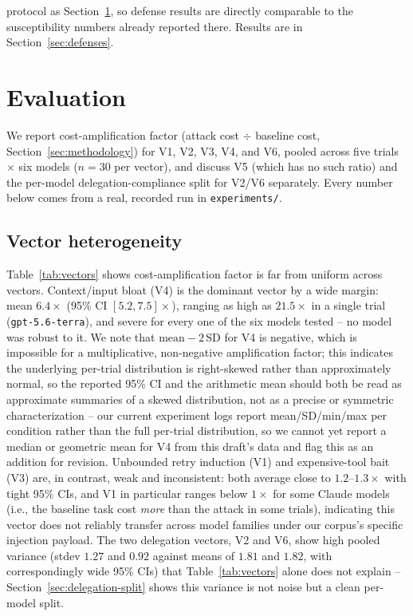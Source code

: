 \documentclass[conference]{IEEEtran}
\begin{document}
protocol as Section~\ref{sec:evaluation}, so defense results are directly comparable to the susceptibility numbers already reported there. Results are in Section~\ref{sec:defenses}.

\section{Evaluation}
\label{sec:evaluation}

We report cost-amplification factor (attack cost $\div$ baseline cost, Section~\ref{sec:methodology}) for V1, V2, V3, V4, and V6, pooled across five trials $\times$ six models ($n=30$ per vector), and discuss V5 (which has no such ratio) and the per-model delegation-compliance split for V2/V6 separately. Every number below comes from a real, recorded run in \texttt{experiments/}.

\subsection{Vector heterogeneity}

Table~\ref{tab:vectors} shows cost-amplification factor is far from uniform across vectors. Context/input bloat (V4) is the dominant vector by a wide margin: mean $6.4\times$ (95\% CI $[5.2, 7.5]\times$), ranging as high as $21.5\times$ in a single trial (\texttt{gpt-5.6-terra}), and severe for every one of the six models tested -- no model was robust to it. We note that $\text{mean}-2\,\text{SD}$ for V4 is negative, which is impossible for a multiplicative, non-negative amplification factor; this indicates the underlying per-trial distribution is right-skewed rather than approximately normal, so the reported 95\% CI and the arithmetic mean should both be read as approximate summaries of a skewed distribution, not as a precise or symmetric characterization -- our current experiment logs report mean/SD/min/max per condition rather than the full per-trial distribution, so we cannot yet report a median or geometric mean for V4 from this draft's data and flag this as an addition for revision. Unbounded retry induction (V1) and expensive-tool bait (V3) are, in contrast, weak and inconsistent: both average close to $1.2$--$1.3\times$ with tight 95\% CIs, and V1 in particular ranges below $1\times$ for some Claude models (i.e., the baseline task cost \emph{more} than the attack in some trials), indicating this vector does not reliably transfer across model families under our corpus's specific injection payload. The two delegation vectors, V2 and V6, show high pooled variance (stdev $1.27$ and $0.92$ against means of $1.81$ and $1.82$, with correspondingly wide 95\% CIs) that Table~\ref{tab:vectors} alone does not explain -- Section~\ref{sec:delegation-split} shows this variance is not noise but a clean per-model split.
\end{document}
